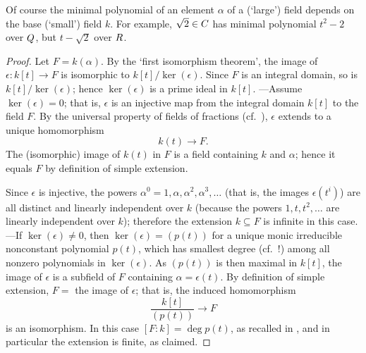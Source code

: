 Of course the minimal polynomial of an element $\alpha$ of a (`large')
field depends on the base (`small') field $k$. For example,
$\sqrt{2} \in C$ has minimal polynomial $t^2 - 2$ over $Q$, but
$t - \sqrt{2}$ over $R$.

\begin{proof}
  Let $F = k(\alpha)$. By the `first isomorphism theorem', the image
  of $\epsilon : k[t] \to F$ is isomorphic to
  $k[t]/\ker(\epsilon)$. Since $F$ is an integral domain, so is
  $k[t]/\ker(\epsilon)$; hence $\ker(\epsilon)$ is a prime ideal in
  $k[t]$.  ---Assume $\ker(\epsilon) = 0$; that is, $\epsilon$ is an
  injective map from the integral domain $k[t]$ to the field $F$. By
  the universal property of fields of fractions (cf.\
  ),
  $\epsilon$ extends to a unique homomorphism
  \[k(t) \to F.\] The (isomorphic) image of $k(t)$ in $F$ is a field
  containing $k$ and $\alpha$; hence it equals $F$ by definition of
  simple extension.

  Since $\epsilon$ is injective, the powers
  $\alpha^0 = 1, \alpha, \alpha^2, \alpha^3, \dots$ (that is, the
  images $\epsilon(t^i)$) are all distinct and linearly independent
  over $k$ (because the powers $1, t, t^2, \dots$ are linearly
  independent over $k$); therefore the extension $k \subseteq F$ is
  infinite in this case.  ---If $\ker(\epsilon) \neq 0$, then
  $\ker(\epsilon) = (p(t))$ for a unique monic irreducible nonconstant
  polynomial $p(t)$, which has smallest degree (cf.\
  !) among all nonzero
  polynomials in $\ker(\epsilon)$.  As $(p(t))$ is then maximal in
  $k[t]$, the image of $\epsilon$ is a subfield of $F$ containing
  $\alpha = \epsilon(t)$. By definition of simple extension, $F = $
  the image of $\epsilon$; that is, the induced homomorphism
  \[\frac{k[t]}{(p(t))} \to F\]
  is an isomorphism. In this case $[F : k] = \deg p(t)$, as recalled
  in , and in particular the
  extension is finite, as claimed.
\end{proof}

